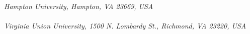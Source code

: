 \begin{titlepage}
\begin{center}
       \vspace*{1.0cm}
        \\
       \vspace*{0.2cm}
       \noindent \emph{Hampton University, Hampton, VA 23669, USA} \\

        \vspace*{1.0cm}
        \\
       \vspace*{0.2cm}
       \noindent \emph{Virginia Union University, 1500 N. Lombardy St., 
        Richmond, VA 23220, USA} \\
        
        
        
        \vspace*{0.7cm}
        \\
      \end{center}
\renewcommand*{\thefootnote}{\arabic{footnote}}

\date{\today}
     

\end{titlepage}
\sloppy

\titlepage
